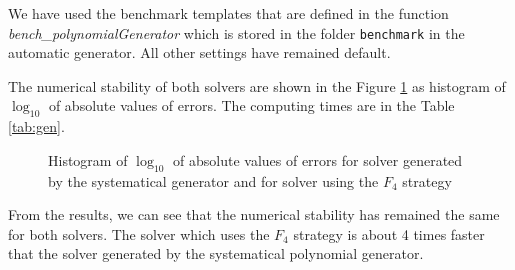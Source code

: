 We have used the benchmark templates that are defined in the function \textit{bench\_poly\-nomialGenerator} which is stored in the folder \texttt{benchmark} in the automatic generator. All other settings have remained default.

The numerical stability of both solvers are shown in the Figure \ref{graph:gen} as histogram of $\log_{10}$ of absolute values of errors. The computing times are in the Table \ref{tab:gen}.

\begin{figure}[ht]
  \centering
  \resizebox{0.95\textwidth}{!}{}
  \caption{Histogram of $\log_{10}$ of absolute values of errors for solver generated by the systematical generator and for solver using the $F_4$ strategy}
  \label{graph:gen}
\end{figure}

From the results, we can see that the numerical stability has remained the same for both solvers. The solver which uses the $F_4$ strategy is about 4 times faster that the solver generated by the systematical polynomial generator.

